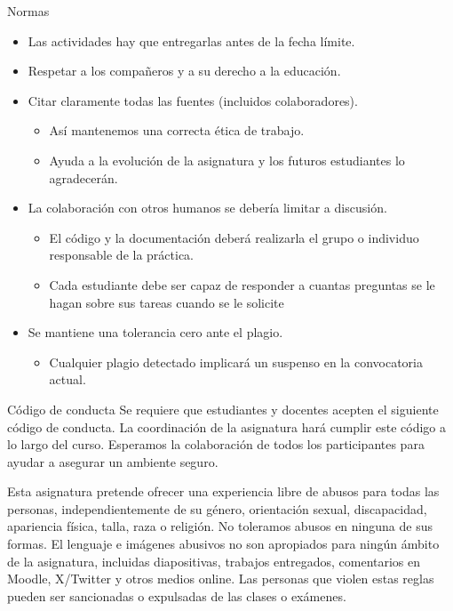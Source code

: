 \begin{frame}{Normas}
\begin{itemize}
    \item Las actividades hay que \alert{entregarlas antes} de la fecha límite.
    \item \alert{Respetar} a los compañeros y a su derecho a la educación.
    \item \alert{Citar} claramente todas las fuentes (incluidos colaboradores).
    \begin{itemize}
        \item Así mantenemos una correcta ética de trabajo.
        \item Ayuda a la evolución de la asignatura y los futuros estudiantes lo agradecerán.
    \end{itemize}
    \item La colaboración con otros humanos se debería \alert{limitar a discusión}.
    \begin{itemize}
        \item El código y la documentación deberá realizarla el grupo o individuo responsable de la práctica.
        \item Cada estudiante debe ser capaz de responder a cuantas preguntas se le hagan sobre sus tareas cuando se le solicite
    \end{itemize}
    \item Se mantiene una \alert{tolerancia cero} ante el \alert{plagio}.
    \begin{itemize}
        \item Cualquier plagio detectado implicará un suspenso en la convocatoria actual.
    \end{itemize}
\end{itemize}
\end{frame}

\begin{frame}{Código de conducta \cite{ConductCode}}
Se requiere que estudiantes y docentes acepten el siguiente código de conducta. La coordinación de la asignatura hará cumplir este código a lo largo del curso. Esperamos la colaboración de todos los participantes para ayudar a asegurar un ambiente seguro.

Esta asignatura pretende ofrecer una experiencia \alert{libre de abusos} para todas las personas, independientemente de su género, orientación sexual, discapacidad, apariencia física, talla, raza o religión. \alert{No toleramos abusos en ninguna de sus formas}. El lenguaje e imágenes abusivos no son apropiados para ningún ámbito de la asignatura, incluidas diapositivas, trabajos entregados, comentarios en Moodle, X/Twitter y otros medios online. Las personas que violen estas reglas pueden ser \alert{sancionadas o expulsadas de las clases o exámenes}.
\end{frame}

